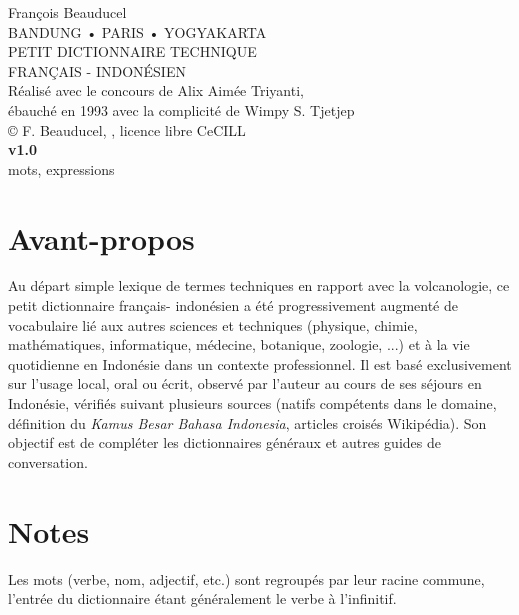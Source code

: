 \documentclass[10pt,twocolumns]{article}
\title{}
\author{}
\begin{document}

\begin{centering}
{\Large François Beauducel}\\[.2cm]
{\small BANDUNG • PARIS • YOGYAKARTA}\\[5cm]
{\Large PETIT DICTIONNAIRE TECHNIQUE}\\[.5cm]
{\fontsize{36}{40}\selectfont FRANÇAIS - INDONÉSIEN}\\[8cm]
Réalisé avec le concours de Alix Aimée Triyanti,\\
ébauché en 1993 avec la complicité de Wimpy S. Tjetjep\\[.2cm]
© F. Beauducel, \the\year{}, licence libre CeCILL\\[1cm]
{\Large\textbf{v1.0}}\\[.2cm]
 mots,  expressions\\
\end{centering}


\twocolumn
\flushleft

\small

\section*{Avant-propos}
Au départ simple lexique de termes techniques en rapport avec la volcanologie, ce petit dictionnaire français- indonésien a été progressivement augmenté de vocabulaire lié aux autres sciences et techniques (physique, chimie, mathématiques, informatique, médecine, botanique, zoologie, ...) et à la vie quotidienne en Indonésie dans un contexte professionnel. Il est basé exclusivement sur l'usage local, oral ou écrit, observé par l'auteur au cours de ses séjours en Indonésie, vérifiés suivant plusieurs sources (natifs compétents dans le domaine, définition du \textit{Kamus Besar Bahasa Indonesia}, articles croisés Wikipédia). Son objectif est de compléter les dictionnaires généraux et autres guides de conversation.

\section*{Notes}
Les mots (verbe, nom, adjectif, etc.) sont regroupés par leur racine commune, l'entrée du dictionnaire étant généralement le verbe à l'infinitif.
\end{document}
